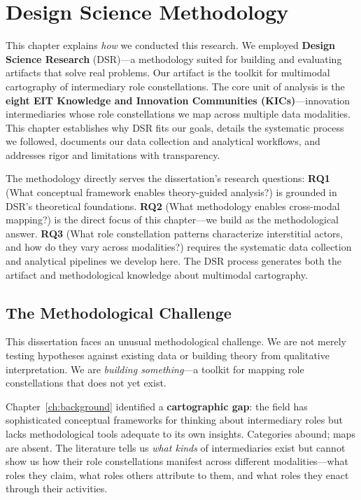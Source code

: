 \documentclass[../main.tex]{subfiles}
\begin{document}
\chapter{Design Science Methodology}
\margintoc

\begin{chapteroverview}
This chapter explains \textit{how} we conducted this research. We employed \textbf{Design Science Research} (DSR)---a methodology suited for building and evaluating artifacts that solve real problems. Our artifact is the \RoleBox toolkit for multimodal cartography of intermediary role constellations. The core unit of analysis is the \textbf{eight EIT Knowledge and Innovation Communities (KICs)}---innovation intermediaries whose role constellations we map across multiple data modalities. This chapter establishes why DSR fits our goals, details the systematic process we followed, documents our data collection and analytical workflows, and addresses rigor and limitations with transparency.

The methodology directly serves the dissertation's research questions: \textbf{RQ1} (What conceptual framework enables theory-guided analysis?) is grounded in DSR's theoretical foundations. \textbf{RQ2} (What methodology enables cross-modal mapping?) is the direct focus of this chapter---we build \RoleBox{} as the methodological answer. \textbf{RQ3} (What role constellation patterns characterize interstitial actors, and how do they vary across modalities?) requires the systematic data collection and analytical pipelines we develop here. The DSR process generates both the artifact and methodological knowledge about multimodal cartography.
\end{chapteroverview}


\section{The Methodological Challenge}

This dissertation faces an unusual methodological challenge. We are not merely testing hypotheses against existing data or building theory from qualitative interpretation. We are \textit{building something}---a toolkit for mapping role constellations that does not yet exist.

Chapter~\ref{ch:background} identified a \textbf{cartographic gap}: the field has sophisticated conceptual frameworks for thinking about intermediary roles but lacks methodological tools adequate to its own insights. Categories abound; maps are absent. The literature tells us \emph{what kinds} of intermediaries exist but cannot show us how their role constellations manifest across different modalities---what roles they claim, what roles others attribute to them, and what roles they enact through their activities.
\end{document}
